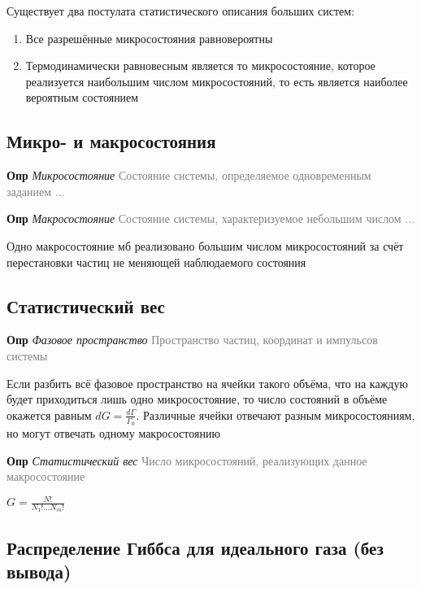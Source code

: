 \documentclass[a4paper, 14pt]{article}
\begin{document}
    Существует два постулата статистического описания больших систем:
    
    \begin{enumerate}
        \item Все разрешённые микросостояния равновероятны
        \item Термодинамически равновесным является то микросостояние, которое реализуется наибольшим числом
        микросостояний, то есть является наиболее вероятным состоянием
    \end{enumerate}
    
    \subsection{Микро- и макросостояния}
    
    \textbf{Опр} \textit{Микросостояние} \textcolor{gray}{Состояние системы, определяемое одновременным заданием ...}
    
    \textbf{Опр} \textit{Макросостояние} \textcolor{gray}{Состояние системы, характеризуемое небольшим числом ...}
    
    Одно макросостояние мб реализовано большим числом микросостояний за счёт перестановки частиц не меняющей
    наблюдаемого состояния
    
    \subsection{Статистический вес}
    
    \textbf{Опр} \textit{Фазовое пространство} \textcolor{gray}{Пространство частиц, координат и импульсов системы}
    
    Если разбить всё фазовое пространство на ячейки такого объёма, что на каждую будет приходиться лишь одно
    микросостояние, то число состояний в объёме окажется равным $dG = \frac{d\Gamma}{\Gamma_0}$.
    Различные ячейки отвечают разным микросостояниям, но могут отвечать одному макросостоянию
    
    \textbf{Опр} \textit{Статистический вес} \textcolor{gray}{Число микросостояний, реализующих данное макросостояние}
    
    $G = \frac{N!}{N_1! \dots N_m!}$
    
    \subsection{Распределение Гиббса для идеального газа (без вывода)}
    
\end{document}
